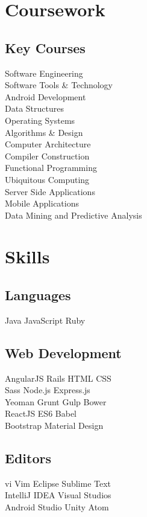 \documentclass[]{deedy-resume-openfont}
\begin{document}
\begin{minipage}[t]{0.33\textwidth}
\section{Coursework}
\subsection{Key Courses}
Software Engineering \\
Software Tools \& Technology \\
Android Development \\
Data Structures \\
Operating Systems \\
Algorithms \& Design \\
Computer Architecture \\
Compiler Construction \\
Functional Programming \\
Ubiquitous Computing \\
Server Side Applications \\
Mobile Applications \\
Data Mining and Predictive Analysis
\sectionsep


\section{Skills}
\subsection{Languages}
Java \textbullet{} JavaScript \textbullet{} Ruby \\
\sectionsep
\subsection{Web Development}
AngularJS \textbullet{} Rails \textbullet{} HTML \textbullet{} CSS \\
Sass \textbullet{} Node.js \textbullet{} Express.js \\
Yeoman \textbullet{} Grunt \textbullet{} Gulp \textbullet{} Bower \\
ReactJS \textbullet{} ES6 \textbullet{} Babel \\
Bootstrap \textbullet{} Material Design \\
\sectionsep
\subsection{Editors}
vi \textbullet{} Vim \textbullet{} Eclipse \textbullet{} Sublime Text \\
IntelliJ IDEA \textbullet{} Visual Studios \\
Android Studio \textbullet{} Unity \textbullet{} Atom
\sectionsep

\end{minipage}
\end{document}
